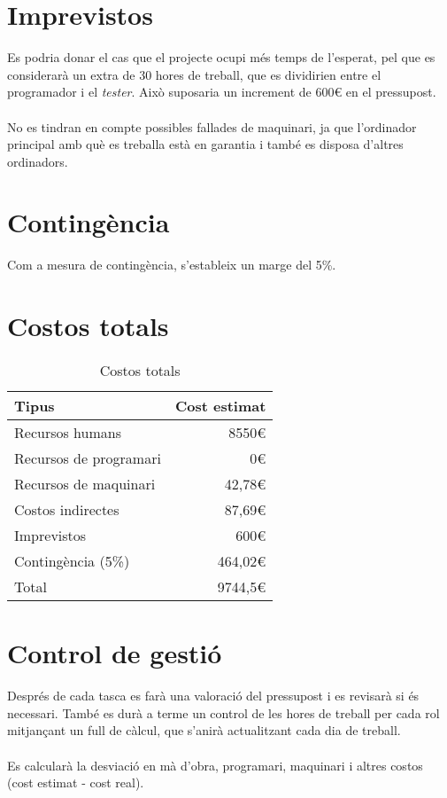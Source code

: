 \section{Imprevistos}
	Es podria donar el cas que el projecte ocupi més temps de l'esperat, pel que es considerarà un extra de 30 hores de treball, que es dividirien entre el programador i el \textit{tester}.
	Això suposaria un increment de 600€ en el pressupost. \\\\
	No es tindran en compte possibles fallades de maquinari, ja que l'ordinador principal amb què es treballa està en garantia i també es disposa d'altres ordinadors.

\section{Contingència}
	Com a mesura de contingència, s'estableix un marge del 5\%.

\section{Costos totals}
	\begin{table}[H]
		\begin{center}
			\begin{tabular}{p{8cm}  !{\vrule width -1pt}r}
				\textbf{Tipus} & \textbf{Cost estimat} \\ \hline
				Recursos humans & 8550€ \\
				Recursos de programari & 0€ \\
				Recursos de maquinari & 42,78€ \\
				Costos indirectes & 87,69€ \\
				Imprevistos & 600€ \\
				Contingència (5\%) & 464,02€ \\
				\noalign{\vskip 4mm}
				Total & 9744,5€
			\end{tabular}
		\end{center}
		\caption{Costos totals}
	\end{table}

\section{Control de gestió}
	Després de cada tasca es farà una valoració del pressupost i es revisarà si és necessari.
	També es durà a terme un control de les hores de treball per cada rol mitjançant un full de càlcul, que s'anirà actualitzant cada dia de treball.\\\\
	Es calcularà la desviació en mà d'obra, programari, maquinari i altres costos (cost estimat - cost real).
